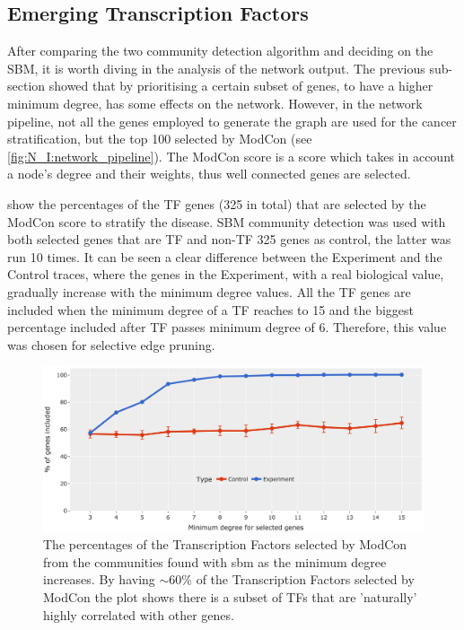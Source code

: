 \subsection{Emerging Transcription Factors} \label{s:N_I:sel_tfs}

After comparing the two community detection algorithm and deciding on the SBM, it is worth diving in the analysis of the network output. The previous sub-section showed that by prioritising a certain subset of genes, to have a higher minimum degree, has some effects on the network. However, in the network pipeline, not all the genes employed to generate the graph are used for the cancer stratification, but the top 100 selected by ModCon (see \cref{fig:N_I:network_pipeline}). The ModCon score is a score which takes in account a node's degree and their weights, thus well connected genes are selected.

 show the percentages of the TF genes (325 in total) that are selected by the ModCon score to stratify the disease. SBM community detection was used with both selected genes that are TF and non-TF 325 genes as control, the latter was run 10 times. It can be seen a clear difference between the Experiment and the Control traces, where the genes in the Experiment, with a real biological value, gradually increase with the minimum degree values. All the TF genes are included when the minimum degree of a TF reaches to 15 and the biggest percentage included after TF passes minimum degree of 6. Therefore, this value was chosen for selective edge pruning.


\begin{figure}[!b]   
\centering
\includegraphics[width=1.0\textwidth,height=1.0\textheight,keepaspectratio]{Sections/Network_I/Resources/selective_pruning/com_comp/ctrls_min_dig_mev.png}
  \caption{The percentages of the Transcription Factors selected by ModCon from the communities found with \acrlong{sbm} as the minimum degree increases. By having $\sim60\%$ of the Transcription Factors selected by ModCon the plot shows there is a subset of TFs that are 'naturally' highly correlated with other genes. }
\label{fig:N_I:sel_tfs}
\end{figure}

